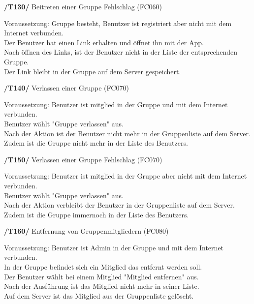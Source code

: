 \begin{itemize}
\begin{itemize}
\begin{itemize}
\begin{itemize}
\textbf{/T130/} Beitreten einer Gruppe Fehlschlag (FC060)\\
\begin{itemize}
Voraussetzung: Gruppe besteht, Benutzer ist registriert aber nicht mit dem Internet verbunden.\\
Der Benutzer hat einen Link erhalten und öffnet ihn mit der App.                               \\
Nach öffnen des Links, ist der Benutzer nicht in der Liste der entsprechenden Gruppe.           \\
Der Link bleibt in der Gruppe auf dem Server gespeichert.                                        \\
\end{itemize}

\textbf{/T140/} Verlassen einer Gruppe (FC070)\\
\begin{itemize}
Voraussetzung: Benutzer ist mitglied in der Gruppe und mit dem Internet verbunden.\\
Benutzer wählt "Gruppe verlassen" aus.\\
Nach der Aktion ist der Benutzer nicht mehr in der Gruppenliste auf dem Server.\\
Zudem ist die Gruppe nicht mehr in der Liste des Benutzers.\\
\end{itemize}

\textbf{/T150/} Verlassen einer Gruppe Fehlschlag (FC070)\\
\begin{itemize}
Voraussetzung: Benutzer ist mitglied in der Gruppe aber nicht mit dem Internet verbunden.\\
Benutzer wählt "Gruppe verlassen" aus.\\
Nach der Aktion verbleibt der Benutzer in der Gruppenliste auf dem Server.\\
Zudem ist die Gruppe immernoch in der Liste des Benutzers.\\
\end{itemize}

\textbf{/T160/} Entfernung von Gruppenmitgliedern (FC080)\\
\begin{itemize}
Voraussetzung: Benutzer ist Admin in der Gruppe und mit dem Internet verbunden.\\
In der Gruppe befindet sich ein Mitglied das entfernt werden soll.              \\
Der Benutzer wählt bei einem Mitglied "Mitglied entfernen" aus.                  \\
Nach der Ausführung ist das Mitglied nicht mehr in seiner Liste.                 \\
Auf dem Server ist das Mitglied aus der Gruppenliste gelöscht.                    \\
\end{itemize}


\end{itemize}
\end{itemize}
\end{itemize}
\end{itemize}

